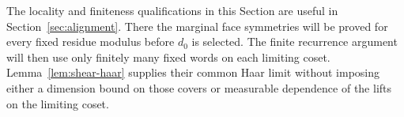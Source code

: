 The locality and finiteness qualifications in this Section are useful in
Section~\ref{sec:alignment}.  There the marginal face symmetries will be
proved for every fixed residue modulus before $d_0$ is selected.  The
finite recurrence argument will then use only finitely many fixed words
on each limiting coset.  Lemma~\ref{lem:shear-haar} supplies their common
Haar limit without imposing either a dimension bound on those covers or
measurable dependence of the lifts on the limiting coset.
